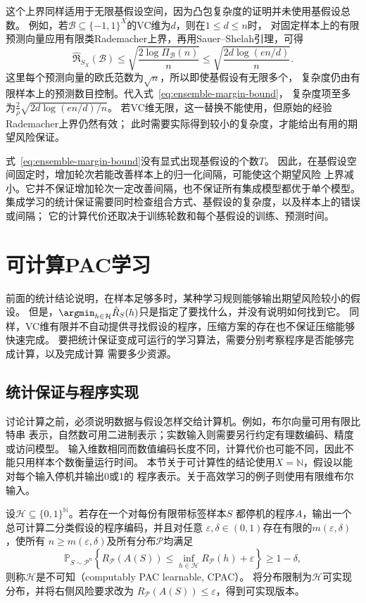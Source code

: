 这个上界同样适用于无限基假设空间，因为凸包复杂度的证明并未使用基假设总数。
例如，若$\mathcal B\subseteq\{-1,1\}^X$的VC维为$d$，则在$1\leq d\leq n$时，
对固定样本上的有限预测向量应用有限类Rademacher上界，再用Sauer--Shelah引理，可得
\[
 \widehat{\mathfrak R}_{S_X}(\mathcal B)
 \leq\sqrt{\frac{2\log\Pi_{\mathcal B}(n)}{n}}
 \leq\sqrt{\frac{2d\log(en/d)}{n}}.
\]
这里每个预测向量的欧氏范数为$\sqrt n$，所以即使基假设有无限多个，
复杂度仍由有限样本上的预测数目控制。代入式~\eqref{eq:ensemble-margin-bound}，
复杂度项至多为$\frac{2}{\rho}\sqrt{2d\log(en/d)/n}$。
若VC维无限，这一替换不能使用，但原始的经验Rademacher上界仍然有效；
此时需要实际得到较小的复杂度，才能给出有用的期望风险保证。

式~\eqref{eq:ensemble-margin-bound}没有显式出现基假设的个数$T$。
因此，在基假设空间固定时，增加轮次若能改善样本上的归一化间隔，可能使这个期望风险
上界减小。它并不保证增加轮次一定改善间隔，也不保证所有集成模型都优于单个模型。
集成学习的统计保证需要同时检查组合方式、基假设的复杂度，以及样本上的错误或间隔；
它的计算代价还取决于训练轮数和每个基假设的训练、预测时间。

\section{可计算PAC学习}
\label{sec:computable-binary-learning}

前面的统计结论说明，在样本足够多时，某种学习规则能够输出期望风险较小的假设。
但是，$\argmin_{h\in\mathcal H}\hat R_S(h)$只是指定了要找什么，并没有说明如何找到它。
同样，VC维有限并不自动提供寻找假设的程序，压缩方案的存在也不保证压缩能够快速完成。
要把统计保证变成可运行的学习算法，需要分别考察程序是否能够完成计算，以及完成计算
需要多少资源。

\subsection{统计保证与程序实现}

讨论计算之前，必须说明数据与假设怎样交给计算机。例如，布尔向量可用有限比特串
表示，自然数可用二进制表示；实数输入则需要另行约定有理数编码、精度或访问模型。
输入维数相同而数值编码长度不同，计算代价也可能不同，因此不能只用样本个数衡量运行时间。
本节关于可计算性的结论使用$X=\mathbb N$，假设以能对每个输入停机并输出0或1的
程序表示。关于高效学习的例子则使用有限维布尔输入。

\begin{definition}[可计算PAC学习]
\label{def:binary-computable-pac}
设$\mathcal H\subseteq\{0,1\}^{\mathbb N}$。若存在一个对每份有限带标签样本$S$
都停机的程序$A$，输出一个总可计算二分类假设的程序编码，并且对任意
$\varepsilon,\delta\in(0,1)$存在有限的$m(\varepsilon,\delta)$，使所有
$n\geq m(\varepsilon,\delta)$及所有分布$\mathcal P$均满足
\[
 \mathbb P_{S\sim\mathcal P^n}\left\{
 R_{\mathcal P}(A(S))\leq\inf_{h\in\mathcal H}R_{\mathcal P}(h)+\varepsilon
 \right\}\geq1-\delta,
\]
则称$\mathcal H$是不可知（computably PAC learnable, CPAC）。
将分布限制为$\mathcal H$可实现分布，并将右侧风险要求改为
$R_{\mathcal P}(A(S))\leq\varepsilon$，得到可实现版本。
\end{definition}

